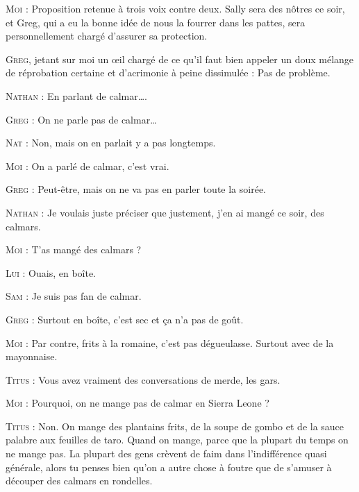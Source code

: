 \begin{dialogue}

\textsc{Moi} : Proposition retenue à trois voix contre deux. Sally sera des nôtres ce soir, et Greg, qui a eu la bonne idée de nous la fourrer dans les pattes, sera personnellement chargé d’assurer sa protection.

\textsc{Greg}, jetant sur moi un œil chargé de ce qu’il faut bien appeler un doux mélange de réprobation certaine et d’acrimonie à peine dissimulée : Pas de problème.

\textsc{Nathan} : En parlant de calmar….

\textsc{Greg} : On ne parle pas de calmar…

\textsc{Nat} : Non, mais on en parlait y a pas longtemps.

\textsc{Moi} : On a parlé de calmar, c’est vrai.

\textsc{Greg} : Peut-être, mais on ne va pas en parler toute la soirée.

\textsc{Nathan} : Je voulais juste préciser que justement, j’en ai mangé ce soir, des calmars.

\textsc{Moi} : T’as mangé des calmars ?

\textsc{Lui} : Ouais, en boîte.

\textsc{Sam} : Je suis pas fan de calmar.

\textsc{Greg} : Surtout en boîte, c’est sec et ça n’a pas de goût.

\textsc{Moi} : Par contre, frits à la romaine, c’est pas dégueulasse. Surtout avec de la mayonnaise.

\textsc{Titus} : Vous avez vraiment des conversations de merde, les gars.

\textsc{Moi} : Pourquoi, on ne mange pas de calmar en Sierra Leone ?

\textsc{Titus} : Non. On mange des plantains frits, de la soupe de gombo et de la sauce palabre aux feuilles de taro. Quand on mange, parce que la plupart du temps on ne mange pas. La plupart des gens crèvent de faim dans l’indifférence quasi générale, alors tu penses bien qu’on a autre chose à foutre que de s’amuser à découper des calmars en rondelles.


\end{dialogue}
